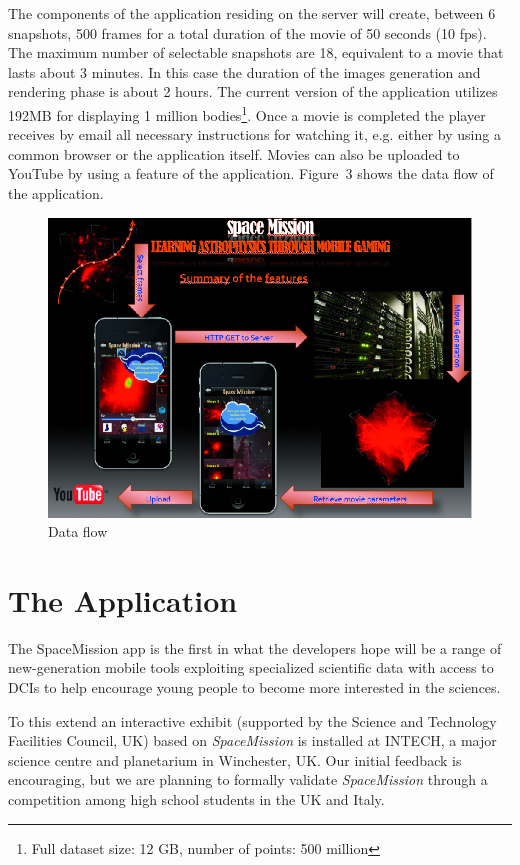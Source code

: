 The components of the application residing on the server will  create, between  6 snapshots,
500 frames for a total duration of the movie of 50 seconds  (10 fps).
The maximum number of selectable snapshots are 18, equivalent  to a movie that lasts about 3 minutes. In this case the duration of the images generation and rendering phase is about  2 hours.
The current version of the application utilizes 192MB for displaying 1 million bodies\footnote{Full dataset size: 12 GB, number of points: 500 million}. Once a movie is completed the player receives by email all necessary instructions for watching it, e.g. either by using a common browser or the application itself. Movies can also be uploaded to YouTube by using a feature of the application.
Figure~3 shows the data flow of the application.

\begin{figure}[h]
\centering
\includegraphics[scale=0.9]{part5/Massimino_O24/P024_f3}
\caption{Data flow}
\end{figure}

\section{The Application}
The SpaceMission app is the first in what the developers hope will be a range of new-generation mobile tools exploiting specialized scientific data with access to DCIs to help encourage young people to become more interested in the sciences.

To this extend an interactive exhibit (supported by the Science and Technology Facilities Council, UK) based on \emph{SpaceMission} is installed at INTECH, a major science centre and planetarium in Winchester, UK. Our initial feedback is encouraging, but we are planning to formally validate \emph{SpaceMission} through a competition among high school students in the UK and Italy.


